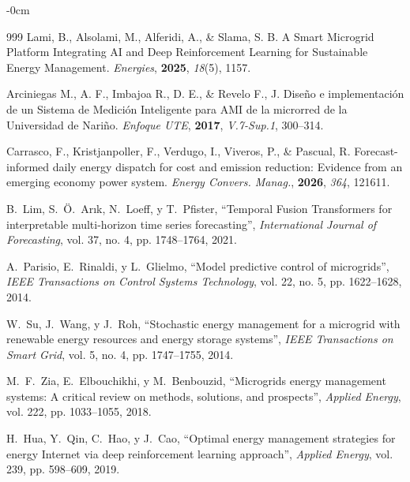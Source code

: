 \documentclass[journal,article,submit,pdftex,moreauthors]{Definitions/mdpi}
\begin{document}
\begin{adjustwidth}{-\extralength}{0cm}
\begin{thebibliography}{999}
Lami, B., Alsolami, M., Alferidi, A., \& Slama, S. B. A Smart Microgrid Platform Integrating AI and Deep Reinforcement Learning for Sustainable Energy Management. \textit{Energies}, \textbf{2025}, \textit{18}(5), 1157.

Arciniegas M., A. F., Imbajoa R., D. E., \& Revelo F., J. Dise\~no e implementaci\'on de un Sistema de Medici\'on Inteligente para AMI de la microrred de la Universidad de Nari\~no. \textit{Enfoque UTE}, \textbf{2017}, \textit{V.7-Sup.1}, 300--314.

Carrasco, F., Kristjanpoller, F., Verdugo, I., Viveros, P., \& Pascual, R. Forecast-informed daily energy dispatch for cost and emission reduction: Evidence from an emerging economy power system. \textit{Energy Convers. Manag.}, \textbf{2026}, \textit{364}, 121611.

B.~Lim, S.~{\"O}.~Ar{\i}k, N.~Loeff, y T.~Pfister, ``Temporal Fusion Transformers for interpretable multi-horizon time series forecasting'', \emph{International Journal of Forecasting}, vol. 37, no. 4, pp. 1748--1764, 2021.

A.~Parisio, E.~Rinaldi, y L.~Glielmo, ``Model predictive control of microgrids'', \emph{IEEE Transactions on Control Systems Technology}, vol. 22, no. 5, pp. 1622--1628, 2014.

W.~Su, J.~Wang, y J.~Roh, ``Stochastic energy management for a microgrid with renewable energy resources and energy storage systems'', \emph{IEEE Transactions on Smart Grid}, vol. 5, no. 4, pp. 1747--1755, 2014.

M.~F.~Zia, E.~Elbouchikhi, y M.~Benbouzid, ``Microgrids energy management systems: A critical review on methods, solutions, and prospects'', \emph{Applied Energy}, vol. 222, pp. 1033--1055, 2018.

H.~Hua, Y.~Qin, C.~Hao, y J.~Cao, ``Optimal energy management strategies for energy Internet via deep reinforcement learning approach'', \emph{Applied Energy}, vol. 239, pp. 598--609, 2019.

\end{thebibliography}
\PublishersNote{}
\end{adjustwidth}
\end{document}
